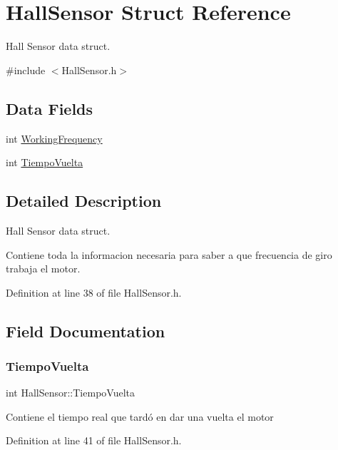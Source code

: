 \hypertarget{structHallSensor}{}\section{Hall\+Sensor Struct Reference}
\label{structHallSensor}


Hall Sensor data struct.  




{\ttfamily \#include $<$Hall\+Sensor.\+h$>$}

\subsection*{Data Fields}
\begin{DoxyCompactItemize}
\item 
int \hyperlink{structHallSensor_aa9598178f2fba9eae32ca1f27fedb76d}{Working\+Frequency}
\item 
int \hyperlink{structHallSensor_aea93d53e0446642c786dd83f8f5f0cde}{Tiempo\+Vuelta}
\end{DoxyCompactItemize}


\subsection{Detailed Description}
Hall Sensor data struct. 

Contiene toda la informacion necesaria para saber a que frecuencia de giro trabaja el motor. 

Definition at line 38 of file Hall\+Sensor.\+h.



\subsection{Field Documentation}
\mbox{\label{structHallSensor_aea93d53e0446642c786dd83f8f5f0cde}} 
\subsubsection{\texorpdfstring{Tiempo\+Vuelta}{TiempoVuelta}}
{\footnotesize\ttfamily int Hall\+Sensor\+::\+Tiempo\+Vuelta}

Contiene el tiempo real que tardó en dar una vuelta el motor 

Definition at line 41 of file Hall\+Sensor.\+h.



